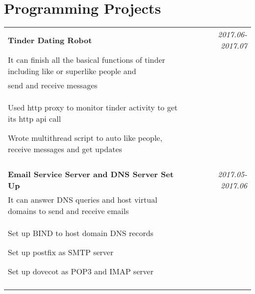 \documentclass[a4paper,10pt]{article}
\begin{document}
\section{Programming Projects}
\begin{tabular}{p{13.5cm}p{0.5cm}r}

\textbf{Tinder Dating Robot} && \emph{2017.06-2017.07} \\
\hspace{1em} It can finish all the basical functions of tinder including like or superlike people and && \vspace{-0.5em}\\
\hspace{1em} send and receive messages && \vspace{-0.5em} \\
\begin{compactitem}
  \item Used http proxy to monitor tinder activity to get its http api call\vspace{0.2em}
  \item Wrote multithread script to auto like people, receive messages and get updates\vspace{0.2em}
\end{compactitem}&&\vspace{-2.2em} \\
\multicolumn{3}{c}{} \\

\textbf{Email Service Server and DNS Server Set Up} && \emph{2017.05-2017.06} \\
\hspace{1em} It can answer DNS queries and host virtual domains to send and receive emails && \vspace{-0.5em} \\
\begin{compactitem}
  \item Set up BIND to host domain DNS records \vspace{0.2em}
  \item Set up postfix as SMTP server \vspace{0.2em}
  \item Set up dovecot as POP3 and IMAP server \vspace{0.2em}  
\end{compactitem}&&\vspace{-2.2em} \\
\multicolumn{3}{c}{} \\



\end{tabular}
\end{document}
